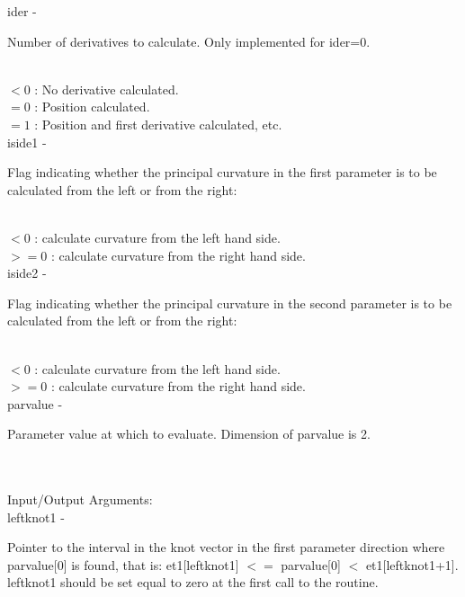         \>\>    {\fov ider}\> - \>  \begin{minipg2}
                     Number of derivatives to calculate.
                     Only implemented for ider=0.
                               \end{minipg2}\\[0.8ex]
                \>\>\>\>  $< 0$ : \> No derivative calculated.\\
                \>\>\>\>  $= 0$ : \> Position calculated.\\
                \>\>\>\>  $= 1$ : \> Position and first derivative calculated, etc.\\
        \>\>    {\fov iside1}\> - \>  \begin{minipg2}
                  Flag indicating whether the principal curvature in the first
                  parameter is to be calculated from the
                     left or from the right:
                               \end{minipg2}\\[0.8ex]
         \>\>\>\>  $< 0$  : \> calculate curvature from the left hand side.\\
         \>\>\>\>  $>= 0$ : \> calculate curvature from the right hand side.\\
        \>\>    {\fov iside2}\> - \>  \begin{minipg2}
                  Flag indicating whether the principal curvature in the second
                  parameter is to be calculated from the
                     left or from the right:
                               \end{minipg2}\\[0.8ex]
         \>\>\>\>  $< 0$  : \> calculate curvature from the left hand side.\\
         \>\>\>\>  $>= 0$ : \> calculate curvature from the right hand side.\\
        \>\>    {\fov parvalue}\> - \>  \begin{minipg2}
                     Parameter value at which to evaluate. Dimension of
                     parvalue is 2.
                               \end{minipg2}\\[0.8ex]
\\
	\>Input/Output Arguments:\\
        \>\>    {\fov leftknot1}\> - \>  \begin{minipg2}
                     Pointer to the interval in the knot vector in the
                     first parameter direction where parvalue[0] is found,
                     that is:
                          et1[leftknot1] $<=$ parvalue[0] $<$ et1[leftknot1+1].
                     leftknot1 should be set equal to zero at the first call
                     to the routine.
                               \end{minipg2}\\[0.8ex]
